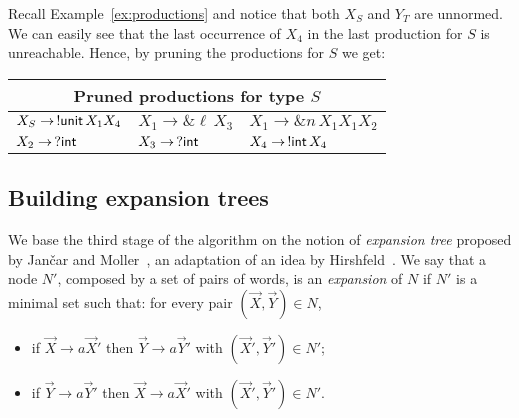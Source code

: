 \begin{example}
  \label{ex:prune}
  Recall Example~\ref{ex:productions} and notice that both
  $X_S$ and
  $Y_T$ are unnormed. We can easily see that the last occurrence of
  $X_4$ in the last production for
  $S$ is unreachable. Hence, by pruning the productions for
  $S$ we get:
  \begin{center}
    \begin{tabular}{l l l}
      \multicolumn{3}{c}{Pruned productions for type $S$}\\ \hline
      $X_S \rightarrow \,!\mathsf{unit}\, X_1 X_4$ &
      $X_1 \rightarrow \& \ell\, X_3$  &
      $X_1 \rightarrow \& n\, X_1 X_1 X_2$
      \\
      $X_2 \rightarrow \,? \mathsf{int}$ &
      $X_3 \rightarrow \,? \mathsf{int}$ &
      $X_4 \rightarrow \,!\mathsf{int}\, X_4$
    \end{tabular}
  \end{center}
\end{example}

\subsection{Building expansion trees}
\label{subsec:expand}


We base the third stage of the algorithm on the notion of
\emph{expansion tree} proposed by Jan{\v{c}}ar and
Moller~\cite{janvcar1999techniques}, an adaptation of an idea by
Hirshfeld~\cite{hirshfeld1996bisimulation}. We say that a node $N'$,
composed by a set of pairs
of words, is an \emph{expansion} of $N$ if $N'$ is a minimal set such
that: for every pair $(\vec X, \vec Y) \in N$,
\begin{itemize}
\item if $\vec X \rightarrow a\vec X'$ then
  $\vec Y \rightarrow a\vec Y'$ with $(\vec X',\vec Y')\in N'$;
\item if $\vec Y \rightarrow a\vec Y'$ then
  $\vec X \rightarrow a \vec X'$ with $(\vec X',\vec Y')\in N'$.
\end{itemize}

